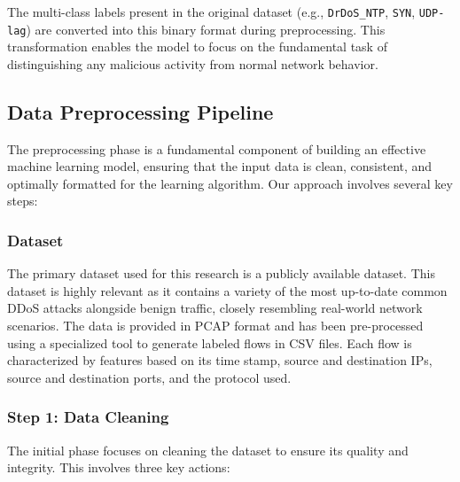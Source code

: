 \documentclass[16pt]{report}
\begin{document}
The multi-class labels present in the original dataset (e.g., \texttt{DrDoS\_NTP}, \texttt{SYN}, \texttt{UDP-lag}) are converted into this binary format during preprocessing. This transformation enables the model to focus on the fundamental task of distinguishing any malicious activity from normal network behavior.


\subsection{Data Preprocessing Pipeline}

The preprocessing phase is a fundamental component of building an effective machine learning model, ensuring that the input data is clean, consistent, and optimally formatted for the learning algorithm. Our approach involves several key steps:

\subsubsection{Dataset}

The primary dataset used for this research is a publicly available dataset. This dataset is highly relevant as it contains a variety of the most up-to-date common DDoS attacks alongside benign traffic, closely resembling real-world network scenarios. The data is provided in PCAP format and has been pre-processed using a specialized tool to generate labeled flows in CSV files. Each flow is characterized by features based on its time stamp, source and destination IPs, source and destination ports, and the protocol used.

\subsubsection{Step 1: Data Cleaning}
The initial phase focuses on cleaning the dataset to ensure its quality and integrity. This involves three key actions:
\end{document}
